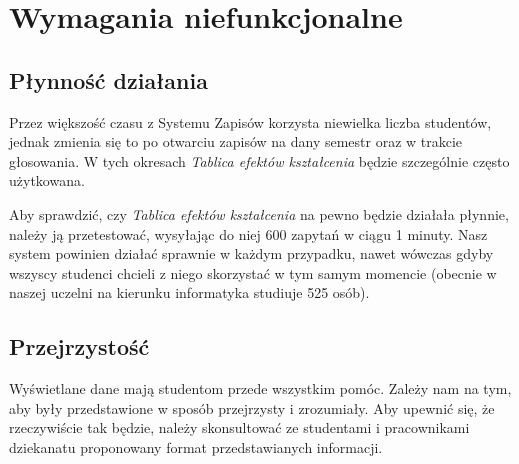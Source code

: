 \documentclass{article}
\begin{document}
\section{Wymagania niefunkcjonalne}

\subsection{Płynność działania}
Przez większość czasu z Systemu Zapisów korzysta niewielka liczba studentów, jednak zmienia się to po otwarciu zapisów na dany semestr oraz w trakcie głosowania.
W tych okresach \textit{Tablica efektów kształcenia} będzie szczególnie często użytkowana.

Aby sprawdzić, czy \textit{Tablica efektów kształcenia} na pewno będzie działała płynnie, należy ją przetestować, wysyłając do niej 600 zapytań w ciągu 1 minuty.
Nasz system powinien działać sprawnie w każdym przypadku, nawet wówczas gdyby wszyscy studenci chcieli z niego skorzystać w tym samym momencie (obecnie w naszej uczelni na kierunku informatyka studiuje 525 osób).

\subsection{Przejrzystość}
Wyświetlane dane mają studentom przede wszystkim pomóc.
Zależy nam na tym, aby były przedstawione w sposób przejrzysty i zrozumiały.
Aby upewnić się, że rzeczywiście tak będzie, należy skonsultować ze studentami i pracownikami dziekanatu proponowany format przedstawianych informacji.
\end{document}
